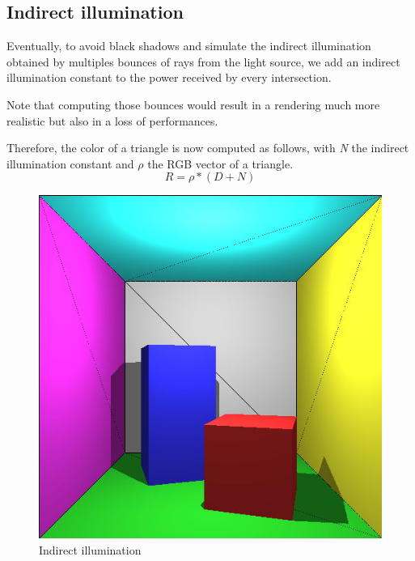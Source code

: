 \subsection{Indirect illumination}
Eventually, to avoid black shadows and simulate the indirect illumination obtained by multiples bounces of rays from the light source, we add an indirect illumination constant to the power received by every intersection.

Note that computing those bounces would result in a rendering much more realistic but also in a loss of performances.

Therefore, the color of a triangle is now computed as follows, with \textit{N} the indirect illumination constant and $\rho$ the RGB vector of a triangle.
\begin{equation}
R = \rho * (D+N)
\end{equation}

\begin{figure}[H]
\centering
\includegraphics[width=0.4\linewidth]{img/ind_light.jpg}
\caption{Indirect illumination}
\end{figure}